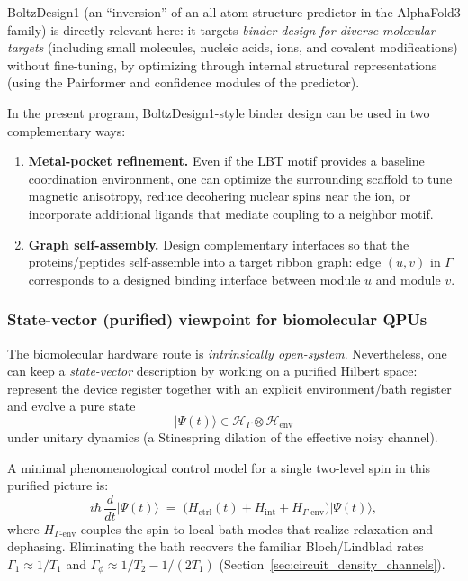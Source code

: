 \documentclass[11pt,oneside]{amsbook}
\numberwithin{equation}{section}
\theoremstyle{plain}
\theoremstyle{definition}
\theoremstyle{remark}
\newcommand{\ket}[1]{\lvert #1 \rangle}
\begin{document}
BoltzDesign1 \cite{Cho2025BoltzDesign1} (an ``inversion'' of an all-atom structure predictor in the AlphaFold3 family) is directly relevant here:
it targets \emph{binder design for diverse molecular targets} (including small molecules, nucleic acids, ions, and covalent modifications) without fine-tuning,
by optimizing through internal structural representations (using the Pairformer and confidence modules of the predictor).

In the present program, BoltzDesign1-style binder design can be used in two complementary ways:
\begin{enumerate}
\item \textbf{Metal-pocket refinement.}
Even if the LBT motif provides a baseline coordination environment, one can optimize the surrounding scaffold to tune magnetic anisotropy, reduce decohering nuclear spins near the ion,
or incorporate additional ligands that mediate coupling to a neighbor motif.

\item \textbf{Graph self-assembly.}
Design complementary interfaces so that the proteins/peptides self-assemble into a target ribbon graph:
edge $(u,v)$ in $\Gamma$ corresponds to a designed binding interface between module $u$ and module $v$.
\end{enumerate}

\subsubsection{State-vector (purified) viewpoint for biomolecular QPUs}
The biomolecular hardware route is \emph{intrinsically open-system}.
Nevertheless, one can keep a \emph{state-vector} description by working on a purified Hilbert space:
represent the device register together with an explicit environment/bath register and evolve a pure state
\[
  \ket{\Psi(t)}\in \mathcal{H}_\Gamma\otimes \mathcal{H}_{\mathrm{env}}
\]
under unitary dynamics (a Stinespring dilation of the effective noisy channel).

A minimal phenomenological control model for a single two-level spin in this purified picture is:
\[
  i\hbar\,\frac{d}{dt}\ket{\Psi(t)}
  \;=\;
  \bigl(H_{\mathrm{ctrl}}(t)+H_{\mathrm{int}}+H_{\Gamma\text{-env}}\bigr)\ket{\Psi(t)},
\]
where $H_{\Gamma\text{-env}}$ couples the spin to local bath modes that realize relaxation and dephasing.
Eliminating the bath recovers the familiar Bloch/Lindblad rates $\Gamma_1\approx 1/T_1$ and
$\Gamma_\phi\approx 1/T_2 - 1/(2T_1)$ (Section~\ref{sec:circuit_density_channels}).
\end{document}
